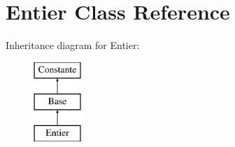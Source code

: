 \hypertarget{class_entier}{\section{Entier Class Reference}
\label{class_entier}
}
Inheritance diagram for Entier\-:\begin{figure}[H]
\begin{center}
\leavevmode
\includegraphics[height=3.000000cm]{class_entier}
\end{center}
\end{figure}
